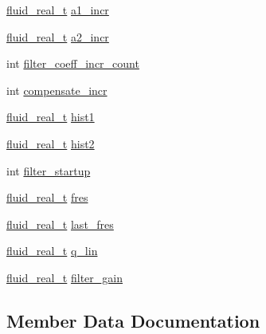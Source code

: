 \begin{DoxyCompactItemize}
\hyperlink{fluidsynth__priv_8h_a9e96f0917747b69cabb7c671bc693dbb}{fluid\+\_\+real\+\_\+t} \hyperlink{struct__fluid__iir__filter__t_aa8a3c222c3ebe50213b09db557b2d76f}{a1\+\_\+incr}
\item 
\hyperlink{fluidsynth__priv_8h_a9e96f0917747b69cabb7c671bc693dbb}{fluid\+\_\+real\+\_\+t} \hyperlink{struct__fluid__iir__filter__t_a2924cdd7aff7a7f54382a866b91f054e}{a2\+\_\+incr}
\item 
int \hyperlink{struct__fluid__iir__filter__t_a21b00d63aaa581947d83af5aa0c0396c}{filter\+\_\+coeff\+\_\+incr\+\_\+count}
\item 
int \hyperlink{struct__fluid__iir__filter__t_af4565151d0d7c189ee31c19fe85061f0}{compensate\+\_\+incr}
\item 
\hyperlink{fluidsynth__priv_8h_a9e96f0917747b69cabb7c671bc693dbb}{fluid\+\_\+real\+\_\+t} \hyperlink{struct__fluid__iir__filter__t_a9571c77902b40bab6e99ca2de72a7424}{hist1}
\item 
\hyperlink{fluidsynth__priv_8h_a9e96f0917747b69cabb7c671bc693dbb}{fluid\+\_\+real\+\_\+t} \hyperlink{struct__fluid__iir__filter__t_a353c2cb7bbae9a5bbfa0b4f91f9162cb}{hist2}
\item 
int \hyperlink{struct__fluid__iir__filter__t_ac35b95cd7955b60385ff0c085cfc9e75}{filter\+\_\+startup}
\item 
\hyperlink{fluidsynth__priv_8h_a9e96f0917747b69cabb7c671bc693dbb}{fluid\+\_\+real\+\_\+t} \hyperlink{struct__fluid__iir__filter__t_abb187dfe5dbd4ae47d2e8c99940e71fd}{fres}
\item 
\hyperlink{fluidsynth__priv_8h_a9e96f0917747b69cabb7c671bc693dbb}{fluid\+\_\+real\+\_\+t} \hyperlink{struct__fluid__iir__filter__t_a2063eb6f1ce2f7ec5218de09330341af}{last\+\_\+fres}
\item 
\hyperlink{fluidsynth__priv_8h_a9e96f0917747b69cabb7c671bc693dbb}{fluid\+\_\+real\+\_\+t} \hyperlink{struct__fluid__iir__filter__t_aaaf0ba836805f79004156cddbdf8c586}{q\+\_\+lin}
\item 
\hyperlink{fluidsynth__priv_8h_a9e96f0917747b69cabb7c671bc693dbb}{fluid\+\_\+real\+\_\+t} \hyperlink{struct__fluid__iir__filter__t_a274b068d53a741a726c923167b0588e3}{filter\+\_\+gain}
\end{DoxyCompactItemize}


\subsection{Member Data Documentation}
\mbox{\label{struct__fluid__iir__filter__t_ad3f82ec6e5c739d343b06e4657dc1b04}} 
